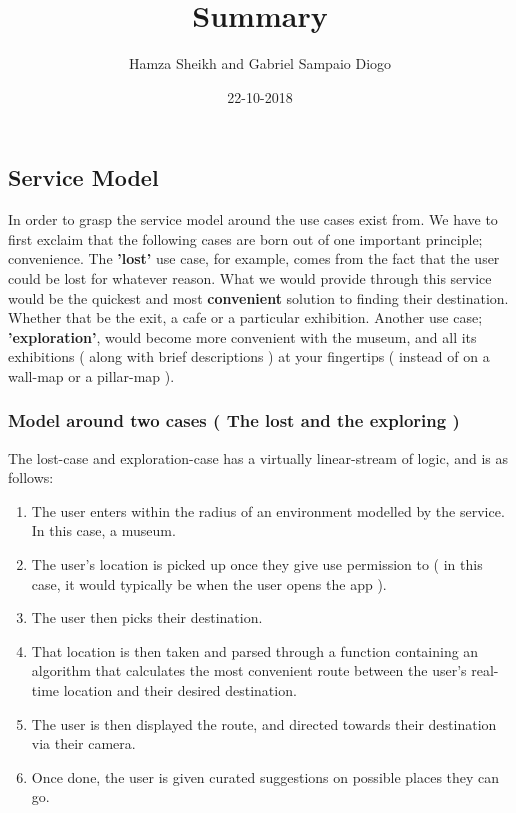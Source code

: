 \documentclass{article}
\title{Summary}
\author{Hamza Sheikh and Gabriel Sampaio Diogo}
\date{22-10-2018}
\begin{document}
\maketitle

\subsection*{Service Model}
In order to grasp the service model around the use cases exist from. We have to first exclaim that the following cases are born out of one important principle; convenience. The \textbf{'lost'} use case, for example, comes from the fact that the user could be lost for whatever reason. What we would provide through this service would be the quickest and most \textbf{convenient} solution to finding their destination. Whether that be the exit, a cafe or a particular exhibition. Another use case; \textbf{'exploration'}, would become more convenient with the museum, and all its exhibitions ( along with brief descriptions ) at your fingertips ( instead of on a wall-map or a pillar-map ).
\subsubsection*{Model around two cases ( The lost and the exploring ) }
The lost-case and exploration-case has a virtually linear-stream of logic, and is as follows:
\begin{enumerate}
    \item The user enters within the radius of an environment modelled by the service. In this case, a museum.
    \item The user’s location is picked up once they give use permission to ( in this case, it would typically be when the user opens the app ). 
    \item The user then picks their destination.
    \item That location is then taken and parsed through a function containing an algorithm that calculates the most convenient route between the user’s real-time location and their desired destination.
    \item The user is then displayed the route, and directed towards their destination via their camera.
    \item Once done, the user is given curated suggestions on possible places they can go.
\end{enumerate}
\end{document}
